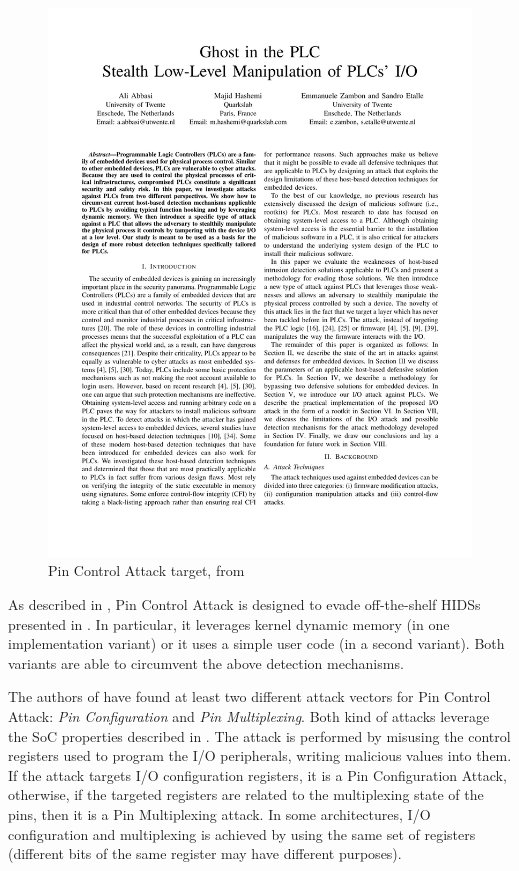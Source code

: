 \begin{figure}[h]
\centerline{\includegraphics[page=6,viewport=50 620 300 750,clip]{res/ghostplc}}
\caption{Pin Control Attack target, from \cite{ghostplc} \label{fig:target}}
\end{figure}

As described in \cite{ghostplc}, Pin Control Attack is designed to evade off-the-shelf HIDSs presented in .
In particular, it leverages kernel dynamic memory (in one implementation variant) or it uses a simple user code (in a second variant).
Both variants are able to circumvent the above detection mechanisms.

The authors of \cite{ghostplc} have found at least two different attack vectors for Pin Control Attack: \emph{Pin Configuration} and \emph{Pin Multiplexing}.
Both kind of attacks leverage the SoC properties described in .
The attack is performed by misusing the control registers used to program the I/O peripherals, writing malicious values into them.
If the attack targets I/O configuration registers, it is a Pin Configuration Attack, otherwise, if the targeted registers are related to the multiplexing state of the pins,
then it is a Pin Multiplexing attack. In some architectures, I/O configuration and multiplexing is achieved by using the same set of registers
(\eg different bits of the same register may have different purposes).

